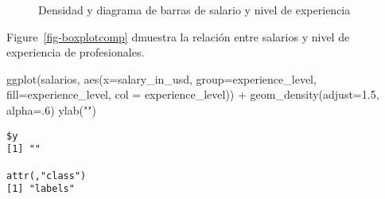 \documentclass[
  letterpaper,
  DIV=11,
  numbers=noendperiod]{scrartcl}
\newenvironment{Shaded}{\begin{snugshade}}{\end{snugshade}}
\newcommand{\AttributeTok}[1]{\textcolor[rgb]{0.40,0.45,0.13}{#1}}
\newcommand{\DecValTok}[1]{\textcolor[rgb]{0.68,0.00,0.00}{#1}}
\newcommand{\FloatTok}[1]{\textcolor[rgb]{0.68,0.00,0.00}{#1}}
\newcommand{\FunctionTok}[1]{\textcolor[rgb]{0.28,0.35,0.67}{#1}}
\newcommand{\NormalTok}[1]{\textcolor[rgb]{0.00,0.23,0.31}{#1}}
\newcommand{\SpecialCharTok}[1]{\textcolor[rgb]{0.37,0.37,0.37}{#1}}
\newcommand{\StringTok}[1]{\textcolor[rgb]{0.13,0.47,0.30}{#1}}
\begin{document}
\begin{figure}

\begin{minipage}[t]{0.50\linewidth}

{\centering 


}

\end{minipage}%
%
\begin{minipage}[t]{0.50\linewidth}

{\centering 


}

\end{minipage}%

\caption{\label{fig-densbar}Densidad y diagrama de barras de salario y
nivel de experiencia}

\end{figure}

Figure~\ref{fig-boxplotcomp} dmuestra la relación entre salarios y nivel
de experiencia de profesionales.

\begin{Shaded}
\begin{Highlighting}[]
\FunctionTok{ggplot}\NormalTok{(salarios, }\FunctionTok{aes}\NormalTok{(}\AttributeTok{x=}\NormalTok{salary\_in\_usd, }\AttributeTok{group=}\NormalTok{experience\_level, }\AttributeTok{fill=}\NormalTok{experience\_level, }\AttributeTok{col =}\NormalTok{ experience\_level)) }\SpecialCharTok{+}
  \FunctionTok{geom\_density}\NormalTok{(}\AttributeTok{adjust=}\FloatTok{1.5}\NormalTok{, }\AttributeTok{alpha=}\NormalTok{.}\DecValTok{6}\NormalTok{) }
  \FunctionTok{ylab}\NormalTok{(}\StringTok{""}\NormalTok{) }
\end{Highlighting}
\end{Shaded}

\begin{verbatim}
$y
[1] ""

attr(,"class")
[1] "labels"
\end{verbatim}
\end{document}
